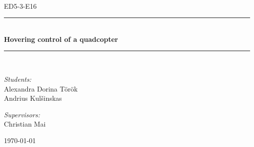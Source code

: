 \newcommand{\HRule}{\rule{\linewidth}{0.5 mm}}
\begin{titlepage}

\begin{center}
\\[0.5cm]

\textsc{\Large ED5-3-E16}\\[0.6cm]

\HRule \\[0.9cm]
{ \Huge \bfseries Hovering control of a quadcopter }\\[0.4cm]

\HRule \\[0.5cm]


\begin{minipage}{0.49\textwidth}
\begin{flushleft} \large
\emph{Students:}\\
Alexandra Dorina Török\\
Andrius Kul\v sinskas\\
\end{flushleft}
\end{minipage}
\begin{minipage}{0.49\textwidth}
\begin{flushright} \large
\emph{Supervisors:} \\
Christian Mai\\
\end{flushright}
\end{minipage}

\vfill

{\large \today}



\end{center}

\end{titlepage}
